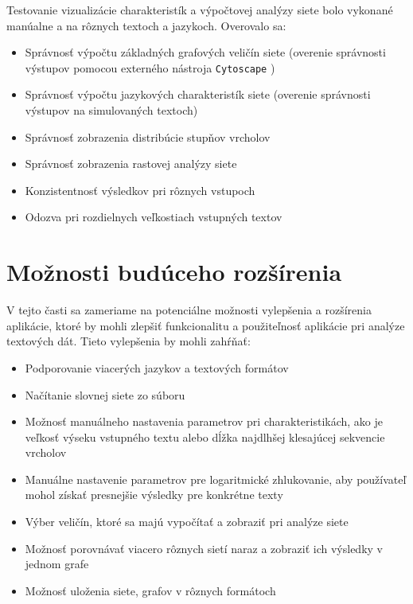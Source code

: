 Testovanie vizualizácie charakteristík a výpočtovej analýzy siete bolo vykonané manúalne a na rôznych textoch a jazykoch. Overovalo sa:
\begin{itemize}
    \item Správnosť výpočtu základných grafových veličín siete (overenie správnosti výstupov pomocou externého nástroja \texttt{Cytoscape} \cite{cytoscape_website} )
    \item Správnosť výpočtu jazykových charakteristík siete (overenie správnosti výstupov na simulovaných textoch)
    \item Správnosť zobrazenia distribúcie stupňov vrcholov
    \item Správnosť zobrazenia rastovej analýzy siete
    \item Konzistentnosť výsledkov pri rôznych vstupoch
    \item Odozva pri rozdielnych veľkostiach vstupných textov
\end{itemize}


\section{Možnosti budúceho rozšírenia}\label{sec:futureExtensions}

V tejto časti sa zameriame na potenciálne možnosti vylepšenia a rozšírenia aplikácie, ktoré by mohli zlepšiť funkcionalitu
a použiteľnosť aplikácie pri analýze textových dát. Tieto vylepšenia by mohli zahŕňať:
\begin{itemize}
    \item Podporovanie viacerých jazykov a textových formátov
    \item Načítanie slovnej siete zo súboru
    \item Možnosť manuálneho nastavenia parametrov pri charakteristikách, ako je veľkosť výseku vstupného textu alebo dĺžka najdlhšej
    klesajúcej sekvencie vrcholov
    \item Manuálne nastavenie parametrov pre logaritmické zhlukovanie, aby používateľ mohol získať presnejšie
    výsledky pre konkrétne texty
    \item Výber veličín, ktoré sa majú vypočítať a zobraziť pri analýze siete
    \item Možnosť porovnávať viacero rôznych sietí naraz a zobraziť ich výsledky v jednom grafe
    \item Možnosť uloženia siete, grafov v rôznych formátoch

\end{itemize}
